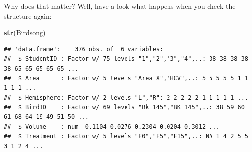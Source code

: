 \documentclass[
]{book}
\newenvironment{Shaded}{\begin{snugshade}}{\end{snugshade}}
\newcommand{\DataTypeTok}[1]{\textcolor[rgb]{0.13,0.29,0.53}{#1}}
\newcommand{\KeywordTok}[1]{\textcolor[rgb]{0.13,0.29,0.53}{\textbf{#1}}}
\newcommand{\NormalTok}[1]{#1}
\newcommand{\OperatorTok}[1]{\textcolor[rgb]{0.81,0.36,0.00}{\textbf{#1}}}
\newcommand{\StringTok}[1]{\textcolor[rgb]{0.31,0.60,0.02}{#1}}
\begin{document}
\begin{Shaded}
\end{Shaded}

Why does that matter? Well, have a look what happens when you check the structure again:

\begin{Shaded}
\begin{Highlighting}[]
\KeywordTok{str}\NormalTok{(Birdsong)}
\end{Highlighting}
\end{Shaded}

\begin{verbatim}
## 'data.frame':    376 obs. of  6 variables:
##  $ StudentID : Factor w/ 75 levels "1","2","3","4",..: 38 38 38 38 38 65 65 65 65 65 ...
##  $ Area      : Factor w/ 5 levels "Area X","HCV",..: 5 5 5 5 5 1 1 1 1 1 ...
##  $ Hemisphere: Factor w/ 2 levels "L","R": 2 2 2 2 2 1 1 1 1 1 ...
##  $ BirdID    : Factor w/ 69 levels "Bk 145","BK 145",..: 38 59 60 61 68 64 19 49 51 50 ...
##  $ Volume    : num  0.1104 0.0276 0.2304 0.0204 0.3012 ...
##  $ Treatment : Factor w/ 5 levels "F0","F5","F15",..: NA 1 4 2 5 5 3 1 2 4 ...
\end{verbatim}
\end{document}
